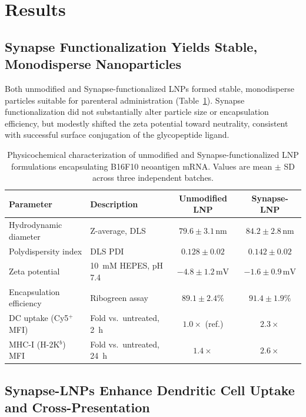 \section{Results}

\subsection{Synapse Functionalization Yields Stable, Monodisperse Nanoparticles}

Both unmodified and Synapse-functionalized LNPs formed stable, monodisperse particles suitable for parenteral administration (Table~\ref{tab:characterization}). Synapse functionalization did not substantially alter particle size or encapsulation efficiency, but modestly shifted the zeta potential toward neutrality, consistent with successful surface conjugation of the glycopeptide ligand.

\begin{table}[htbp]
\centering
\caption{Physicochemical characterization of unmodified and Synapse-functionalized LNP formulations encapsulating B16F10 neoantigen mRNA. Values are mean $\pm$ SD across three independent batches.}
\label{tab:characterization}
\vspace{0.2cm}
\begin{tabularx}{\textwidth}{lXcc}
\toprule
\textbf{Parameter} & \textbf{Description} & \textbf{Unmodified LNP} & \textbf{Synapse-LNP} \\
\midrule
Hydrodynamic diameter & Z-average, DLS & $79.6 \pm 3.1\,\text{nm}$ & $84.2 \pm 2.8\,\text{nm}$ \\
Polydispersity index & DLS PDI & $0.128 \pm 0.02$ & $0.142 \pm 0.02$ \\
Zeta potential & 10~mM HEPES, pH 7.4 & $-4.8 \pm 1.2\,\text{mV}$ & $-1.6 \pm 0.9\,\text{mV}$ \\
Encapsulation efficiency & Ribogreen assay & $89.1 \pm 2.4\%$ & $91.4 \pm 1.9\%$ \\
DC uptake (Cy5$^{+}$ MFI) & Fold vs.\ untreated, 2~h & $1.0\times$ (ref.) & $2.3\times$ \\
MHC-I (H-2K$^{b}$) MFI & Fold vs.\ untreated, 24~h & $1.4\times$ & $2.6\times$ \\
\bottomrule
\end{tabularx}
\end{table}

\subsection{Synapse-LNPs Enhance Dendritic Cell Uptake and Cross-Presentation}

